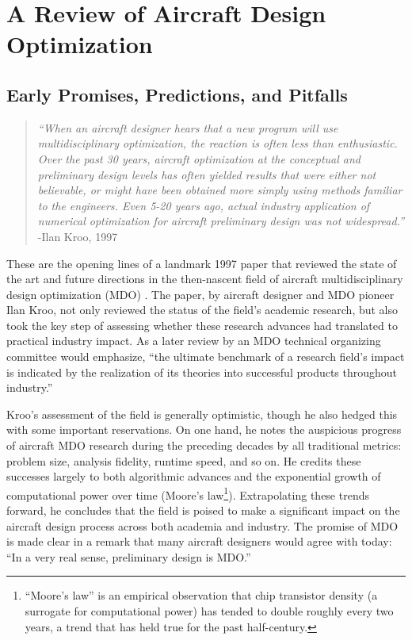 \documentclass[12pt,vi,oneside]{report}
\begin{document}
    \chapter{A Review of Aircraft Design Optimization}
    \label{sec:literature}


    \section{Early Promises, Predictions, and Pitfalls}

    \begin{quote}
        \textit{``When an aircraft designer hears that a new program will use multidisciplinary optimization, the reaction is often less than enthusiastic. Over the past 30 years, aircraft optimization at the conceptual and preliminary design levels has often yielded results that were either not believable, or might have been obtained more simply using methods familiar to the engineers. Even 5-20 years ago, actual industry application of numerical optimization for aircraft preliminary design was not widespread.''}
        \flushright-Ilan Kroo, 1997 \cite{kroo_multidisciplinary_1997}
    \end{quote}

    These are the opening lines of a landmark 1997 paper that reviewed the state of the art and future directions in the then-nascent field of aircraft multidisciplinary design optimization (MDO) \cite{kroo_multidisciplinary_1997}. The paper, by aircraft designer and MDO pioneer Ilan Kroo, not only reviewed the status of the field's academic research, but also took the key step of assessing whether these research advances had translated to practical industry impact. As a later review by an MDO technical organizing committee would emphasize, ``the ultimate benchmark of a research field's impact is indicated by the realization of its theories into successful products throughout industry.'' \cite{agte_mdo_2010}

    Kroo's assessment of the field is generally optimistic, though he also hedged this with some important reservations. On one hand, he notes the auspicious progress of aircraft MDO research during the preceding decades by all traditional metrics: problem size, analysis fidelity, runtime speed, and so on. He credits these successes largely to both algorithmic advances and the exponential growth of computational power over time (Moore's law\footnote{``Moore's law'' is an empirical observation that chip transistor density (a surrogate for computational power) has tended to double roughly every two years, a trend that has held true for the past half-century.}). Extrapolating these trends forward, he concludes that the field is poised to make a significant impact on the aircraft design process across both academia and industry. The promise of MDO is made clear in a remark that many aircraft designers would agree with today: ``In a very real sense, preliminary design is MDO.'' \cite{kroo_multidisciplinary_1997}
\end{document}
